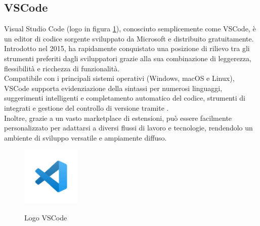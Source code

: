 \subsection{VSCode}
\label{subsec:vscode}
\noindent Visual Studio Code (logo in figura \ref{fig:logo_vscode}), conosciuto semplicemente come VSCode, è un editor di codice sorgente sviluppato da Microsoft e distribuito gratuitamente. Introdotto nel 2015, ha rapidamente conquistato una posizione di rilievo tra gli strumenti preferiti dagli sviluppatori grazie alla sua combinazione di leggerezza, flessibilità e ricchezza di funzionalità. \\Compatibile con i principali sistemi operativi (Windows, macOS e Linux), VSCode supporta evidenziazione della sintassi per numerosi linguaggi, suggerimenti intelligenti e completamento automatico del codice, strumenti di  integrati e gestione del controllo di versione tramite . \\Inoltre, grazie a un vasto marketplace di estensioni, può essere facilmente personalizzato per adattarsi a diversi flussi di lavoro e tecnologie, rendendolo un ambiente di sviluppo versatile e ampiamente diffuso.
\begin{figure}[H]
    \centering
    \includegraphics[width=0.25\textwidth, alt={Logo VSCode}]{img/vscode.jpg}
    \caption[Logo VSCode]{Logo VSCode}\label{fig:logo_vscode}
\end{figure}

